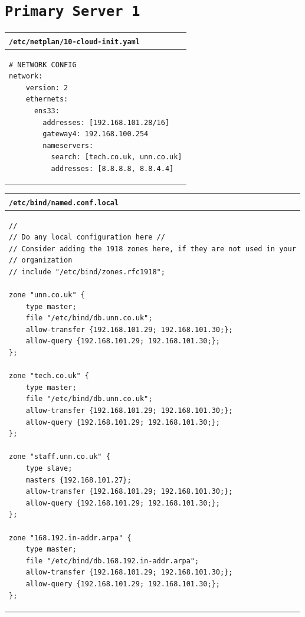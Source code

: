 \documentclass[11pt]{article}
\begin{document}
\section{\texttt{Primary Server 1}}
\begin{table}[ht]
    \begin{tabular}{|p{17.7cm}|} 
        \hline
        \texttt{\textbf{/etc/netplan/10-cloud-init.yaml}}\\ 
        \hline
        \lstset{
                basicstyle=\scriptsize\ttfamily,
              }
              \begin{lstlisting}
# NETWORK CONFIG
network:
    version: 2
    ethernets:
      ens33:
        addresses: [192.168.101.28/16]
        gateway4: 192.168.100.254
        nameservers:
          search: [tech.co.uk, unn.co.uk]
          addresses: [8.8.8.8, 8.8.4.4]
        \end{lstlisting}\\
        \hline
    \end{tabular}
\end{table}

\begin{table}[ht]
    \begin{tabular}{|p{17.7cm}|} 
        \hline
        \texttt{\textbf{/etc/bind/named.conf.local}}\\ 
        \hline
        \lstset{
                basicstyle=\scriptsize\ttfamily,
              }
              \begin{lstlisting}
// 
// Do any local configuration here //
// Consider adding the 1918 zones here, if they are not used in your
// organization
// include "/etc/bind/zones.rfc1918";
                
zone "unn.co.uk" {
    type master;
    file "/etc/bind/db.unn.co.uk";
    allow-transfer {192.168.101.29; 192.168.101.30;};
    allow-query {192.168.101.29; 192.168.101.30;};
};
                
zone "tech.co.uk" {
    type master;
    file "/etc/bind/db.unn.co.uk";
    allow-transfer {192.168.101.29; 192.168.101.30;};
    allow-query {192.168.101.29; 192.168.101.30;};
};
                
zone "staff.unn.co.uk" {
    type slave;
    masters {192.168.101.27};
    allow-transfer {192.168.101.29; 192.168.101.30;};
    allow-query {192.168.101.29; 192.168.101.30;};
};
                
zone "168.192.in-addr.arpa" {
    type master;
    file "/etc/bind/db.168.192.in-addr.arpa";
    allow-transfer {192.168.101.29; 192.168.101.30;};
    allow-query {192.168.101.29; 192.168.101.30;};
};
        \end{lstlisting}\\
        \hline
    \end{tabular}
\end{table}
\end{document}
